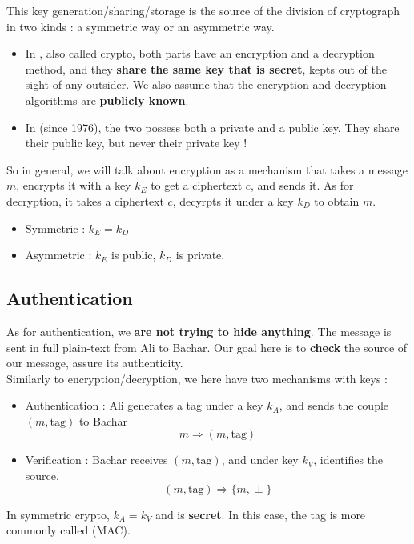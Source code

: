 \documentclass[../Cryptography.tex]{subfiles}
\begin{document}
This key generation/sharing/storage is the source of the division of cryptograph in two kinds : a symmetric way or an asymmetric way.
\begin{itemize}
    \item In , also called  crypto, both parts have an encryption and a decryption method, and they \textbf{share the same key that is secret}, kepts out of the sight of any outsider. We also assume that the encryption and decryption algorithms are \textbf{publicly known}.
    \item In  (since 1976), the two possess both a private and a public key. They share their public key, but never their private key ! \\ 
\end{itemize}

So in general, we will talk about encryption as a mechanism that takes a message $m$, encrypts it with a key $k_E$ to get a ciphertext $c$, and sends it. As for decryption, it takes a ciphertext $c$, decyrpts it under a key $k_D$ to obtain $m$. 
\begin{itemize}
    \item Symmetric : $k_E = k_D$
    \item Asymmetric : $k_E$ is public, $k_D$ is private.
\end{itemize}

\subsection{Authentication}
As for authentication, we \textbf{are not trying to hide anything}. The message is sent in full plain-text from Ali to Bachar. Our goal here is to \textbf{check} the source of our message, assure its authenticity.\\

Similarly to encryption/decryption, we here have two mechanisms with keys :
\begin{itemize}
    \item Authentication : Ali generates a tag under a key $k_A$, and sends the couple $(m,\mathrm{tag})$ to Bachar
    $$m \Rightarrow (m, \mathrm{tag})$$
    \item Verification : Bachar receives $(m,\mathrm{tag})$, and under key $k_V$, identifies the source.
    $$(m, \mathrm{tag}) \Rightarrow \{m, \perp\}$$
\end{itemize}

In symmetric crypto, $k_A = k_V$ and is \textbf{secret}. In this case, the tag is more commonly called  (MAC). \\
\end{document}
